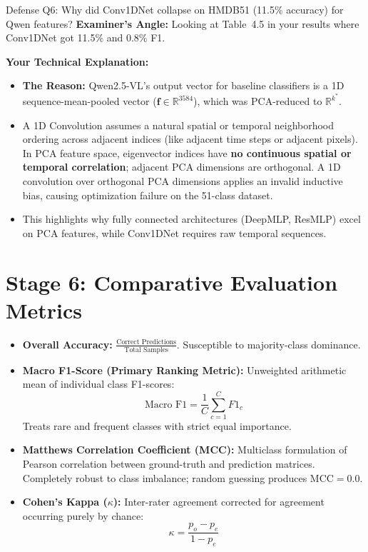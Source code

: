 \documentclass[a4paper, 11pt]{article}
\begin{document}
\begin{defensebox}{Defense Q6: Why did Conv1DNet collapse on HMDB51 (11.5\% accuracy) for Qwen features?}
\textbf{Examiner's Angle:} Looking at Table~4.5 in your results where Conv1DNet got 11.5\% and 0.8\% F1.

\textbf{Your Technical Explanation:}
\begin{itemize}
    \item \textbf{The Reason:} Qwen2.5-VL's output vector for baseline classifiers is a 1D sequence-mean-pooled vector ($\mathbf{f} \in \mathbb{R}^{3584}$), which was PCA-reduced to $\mathbb{R}^{k^*}$.
    \item A 1D Convolution assumes a natural spatial or temporal neighborhood ordering across adjacent indices (like adjacent time steps or adjacent pixels). In PCA feature space, eigenvector indices have \textbf{no continuous spatial or temporal correlation}; adjacent PCA dimensions are orthogonal. A 1D convolution over orthogonal PCA dimensions applies an invalid inductive bias, causing optimization failure on the 51-class dataset.
    \item This highlights why fully connected architectures (DeepMLP, ResMLP) excel on PCA features, while Conv1DNet requires raw temporal sequences.
\end{itemize}
\end{defensebox}

\section{Stage 6: Comparative Evaluation Metrics}

\begin{techbox}
\begin{itemize}
    \item \textbf{Overall Accuracy:} $\frac{\text{Correct Predictions}}{\text{Total Samples}}$. Susceptible to majority-class dominance.
    \item \textbf{Macro F1-Score (Primary Ranking Metric):} Unweighted arithmetic mean of individual class F1-scores:
    \[
    \text{Macro F1} = \frac{1}{C}\sum_{c=1}^C F1_c
    \]
    Treats rare and frequent classes with strict equal importance.
    \item \textbf{Matthews Correlation Coefficient (MCC):} Multiclass formulation of Pearson correlation between ground-truth and prediction matrices. Completely robust to class imbalance; random guessing produces $\text{MCC} = 0.0$.
    \item \textbf{Cohen's Kappa ($\kappa$):} Inter-rater agreement corrected for agreement occurring purely by chance:
    \[
    \kappa = \frac{p_o - p_e}{1 - p_e}
    \]
\end{itemize}
\end{techbox}
\end{document}
